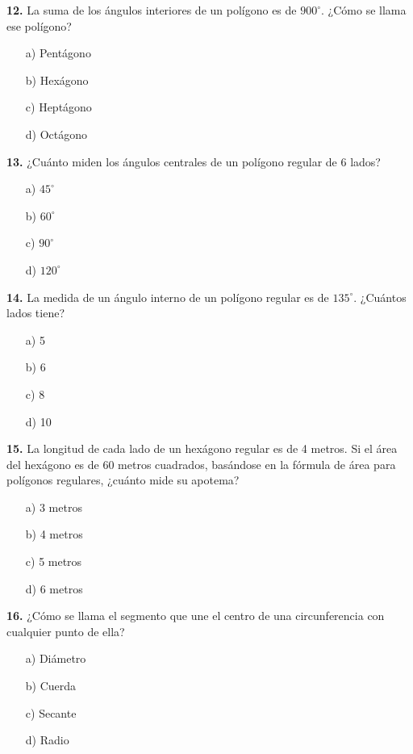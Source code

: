 \noindent\textbf{12.} La suma de los ángulos interiores de un polígono es de $900^\circ$. ¿Cómo se llama ese polígono?

\begin{itemize}
    \item[a)] Pentágono
    \item[b)] Hexágono
    \item[c)] Heptágono
    \item[d)] Octágono
\end{itemize}


\noindent\textbf{13.} ¿Cuánto miden los ángulos centrales de un polígono regular de 6 lados?

\begin{itemize}
    \item[a)] $45^\circ$
    \item[b)] $60^\circ$
    \item[c)] $90^\circ$
    \item[d)] $120^\circ$
\end{itemize}


\noindent\textbf{14.} La medida de un ángulo interno de un polígono regular es de $135^\circ$. ¿Cuántos lados tiene?

\begin{itemize}
    \item[a)] 5
    \item[b)] 6
    \item[c)] 8
    \item[d)] 10
\end{itemize}


\noindent\textbf{15.} La longitud de cada lado de un hexágono regular es de 4 metros. Si el área del hexágono es de 60 metros cuadrados, basándose en la fórmula de área para polígonos regulares, ¿cuánto mide su apotema?

\begin{itemize}
    \item[a)] 3 metros
    \item[b)] 4 metros
    \item[c)] 5 metros
    \item[d)] 6 metros
\end{itemize}


\noindent\textbf{16.} ¿Cómo se llama el segmento que une el centro de una circunferencia con cualquier punto de ella?

\begin{itemize}
    \item[a)] Diámetro
    \item[b)] Cuerda
    \item[c)] Secante
    \item[d)] Radio
\end{itemize}


